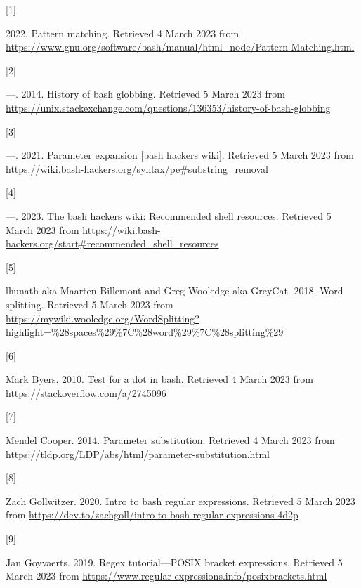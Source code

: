 \documentclass[
  a4paper,
]{article}
\newlength{\cslhangindent}
\newlength{\csllabelwidth}
\newlength{\cslentryspacingunit} %
\newenvironment{CSLReferences}[2] %
 {%
  \setlength{\parindent}{0pt}
  \ifodd #1
  \let\oldpar\par
  \def\par{\hangindent=\cslhangindent\oldpar}
  \fi
  \setlength{\parskip}{#2\cslentryspacingunit}
 }%
 {}
\newcommand{\CSLLeftMargin}[1]{\parbox[t]{\csllabelwidth}{#1}}
\newcommand{\CSLRightInline}[1]{\parbox[t]{\linewidth - \csllabelwidth}{#1}\break}
\begin{document}
\hypertarget{refs}{}
\begin{CSLReferences}{0}{0}
\leavevmode{}%
\CSLLeftMargin{{[}1{]} }%
\CSLRightInline{2022. Pattern matching. Retrieved 4 March 2023 from
\url{https://www.gnu.org/software/bash/manual/html_node/Pattern-Matching.html}}

\leavevmode{}%
\CSLLeftMargin{{[}2{]} }%
\CSLRightInline{---. 2014. History of bash globbing. Retrieved 5 March
2023 from
\url{https://unix.stackexchange.com/questions/136353/history-of-bash-globbing}}

\leavevmode{}%
\CSLLeftMargin{{[}3{]} }%
\CSLRightInline{---. 2021. Parameter expansion {[}bash hackers wiki{]}.
Retrieved 5 March 2023 from
\url{https://wiki.bash-hackers.org/syntax/pe\#substring_removal}}

\leavevmode{}%
\CSLLeftMargin{{[}4{]} }%
\CSLRightInline{---. 2023. The bash hackers wiki: Recommended shell
resources. Retrieved 5 March 2023 from
\url{https://wiki.bash-hackers.org/start\#recommended_shell_resources}}

\leavevmode{}%
\CSLLeftMargin{{[}5{]} }%
\CSLRightInline{lhunath aka Maarten Billemont and Greg Wooledge aka
GreyCat. 2018. Word splitting. Retrieved 5 March 2023 from
\url{https://mywiki.wooledge.org/WordSplitting?highlight=\%28spaces\%29\%7C\%28word\%29\%7C\%28splitting\%29}}

\leavevmode{}%
\CSLLeftMargin{{[}6{]} }%
\CSLRightInline{Mark Byers. 2010. Test for a dot in bash. Retrieved 4
March 2023 from \url{https://stackoverflow.com/a/2745096}}

\leavevmode{}%
\CSLLeftMargin{{[}7{]} }%
\CSLRightInline{Mendel Cooper. 2014. Parameter substitution. Retrieved 4
March 2023 from
\url{https://tldp.org/LDP/abs/html/parameter-substitution.html}}

\leavevmode{}%
\CSLLeftMargin{{[}8{]} }%
\CSLRightInline{Zach Gollwitzer. 2020. Intro to bash regular
expressions. Retrieved 5 March 2023 from
\url{https://dev.to/zachgoll/intro-to-bash-regular-expressions-4d2p}}

\leavevmode{}%
\CSLLeftMargin{{[}9{]} }%
\CSLRightInline{Jan Goyvaerts. 2019. Regex tutorial---POSIX bracket
expressions. Retrieved 5 March 2023 from
\url{https://www.regular-expressions.info/posixbrackets.html}}


\end{CSLReferences}
\end{document}

